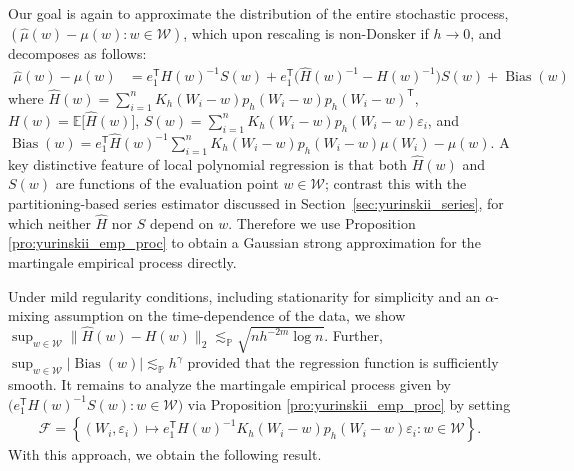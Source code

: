 \documentclass[11pt,lof]{puthesis}
\renewcommand{\P}{\ensuremath{\mathbb{P}}}
\newcommand{\E}{\ensuremath{\mathbb{E}}}
\newcommand{\cF}{\ensuremath{\mathcal{F}}}
\newcommand{\cW}{\ensuremath{\mathcal{W}}}
\newcommand{\T}{\ensuremath{\mathsf{T}}}
\DeclareMathOperator{\Bias}{Bias}
\theoremstyle{break}
\theoremstyle{proof}
\begin{document}
Our goal is again to approximate the distribution of the entire stochastic
process, $(\hat{\mu}(w)-\mu(w):w\in\cW)$, which upon rescaling is non-Donsker
if $h \to 0$, and decomposes as follows:
%
\begin{align*}
  \hat{\mu}(w)-\mu(w)
  &= e_1^\T H(w)^{-1} S(w)
  + e_1^\T \big(\hat H(w)^{-1} - H(w)^{-1}\big) S(w)
  + \Bias(w)
\end{align*}
%
where
$\hat H(w) = \sum_{i=1}^n K_h(W_i-w) p_h(W_i-w) p_h(W_i-w)^\T$,
$H(w) = \E \big[ \hat H(w) \big]$,
$S(w)= \sum_{i=1}^n K_h(W_i-w) p_h(W_i-w) \varepsilon_i$,
and
$\Bias(w) = e_1^\T \hat H(w)^{-1}
\sum_{i=1}^n K_h(W_i-w) p_h(W_i-w) \mu(W_i) - \mu(w)$.
A key distinctive feature of local polynomial regression is that both
$\hat H(w)$ and $S(w)$ are functions of the evaluation point $w\in\cW$;
contrast this with the partitioning-based series estimator discussed in
Section~\ref{sec:yurinskii_series}, for which neither $\hat H$ nor $S$ depend
on $w$.
Therefore we use Proposition \ref{pro:yurinskii_emp_proc} to obtain a Gaussian
strong
approximation for the martingale empirical process directly.

Under mild regularity conditions, including stationarity for simplicity
and an $\alpha$-mixing assumption on the time-dependence of the data, we show
$\sup_{w\in\cW} \|\hat H(w)-H(w)\|_2
\lesssim_\P \sqrt{n h^{-2m}\log n}$.
Further,
$\sup_{w\in\cW} |\Bias(w)|
\lesssim_\P h^\gamma$
provided that the regression function is sufficiently smooth.
It remains to analyze the martingale empirical process given by
$\big(e_1^\T H(w)^{-1} S(w) : w\in\cW\big)$
via Proposition \ref{pro:yurinskii_emp_proc} by setting
%
\begin{align*}
  \cF = \left\{
    (W_i, \varepsilon_i) \mapsto
    e_1^\T H(w)^{-1}
    K_h(W_i-w) p_h(W_i-w) \varepsilon_i
    : w \in \cW
  \right\}.
\end{align*}
%
With this approach, we obtain the following result.
\end{document}
